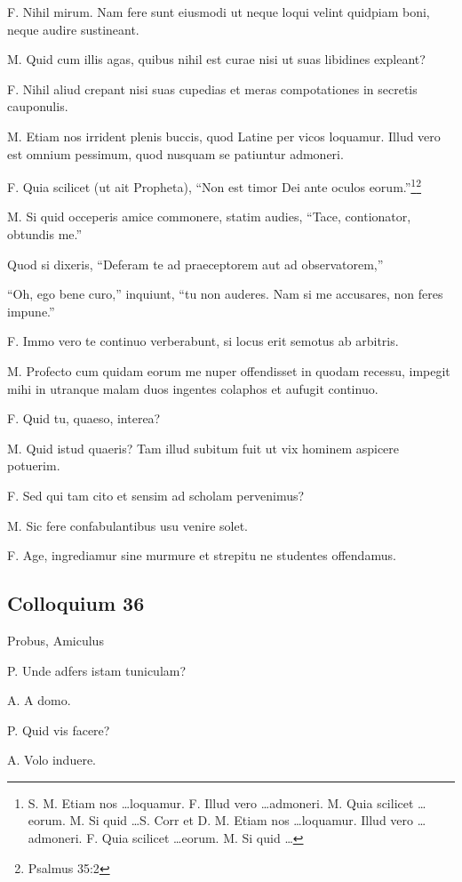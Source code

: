 \documentclass{article}
\begin{document}
F. Nihil mirum. Nam fere sunt eiusmodi ut neque loqui velint quidpiam boni, neque audire sustineant. 

M. Quid cum illis agas, quibus nihil est curae nisi ut suas libidines expleant?

F. Nihil aliud crepant nisi suas cupedias et meras compotationes in secretis cauponulis. 

M. Etiam nos irrident plenis buccis, quod Latine per vicos loquamur. Illud vero est omnium pessimum, quod nusquam se patiuntur admoneri.

F. Quia scilicet (ut ait Propheta), ``Non est timor Dei ante oculos eorum.''\footnote{S. M. Etiam nos \ldots loquamur. F. Illud vero \ldots admoneri. M. Quia scilicet \ldots eorum. M. Si quid \ldots S. Corr et D. M. Etiam nos \ldots loquamur. Illud vero \ldots admoneri. F. Quia scilicet \ldots eorum. M. Si quid \ldots}\footnote{Psalmus 35:2}

M. Si quid occeperis amice commonere, statim audies, ``Tace, contionator, obtundis me.''

Quod si dixeris, ``Deferam te ad praeceptorem aut ad observatorem,''

 ``Oh, ego bene curo,'' inquiunt, ``tu non auderes. Nam si me accusares, non feres impune.'' 

F. Immo vero te continuo verberabunt, si locus erit semotus ab arbitris. 

M. Profecto cum quidam eorum me nuper offendisset in quodam recessu, impegit mihi in utranque malam duos ingentes colaphos et aufugit continuo. 

F. Quid tu, quaeso, interea?

M. Quid istud quaeris? Tam illud subitum fuit ut vix hominem aspicere potuerim. 

F. Sed qui tam cito et sensim ad scholam pervenimus?

M. Sic fere confabulantibus usu venire solet. 

F. Age, ingrediamur sine murmure et strepitu ne studentes offendamus.

\subsection{Colloquium 36}
Probus, Amiculus

P. Unde adfers istam tuniculam?

A. A domo. 

P. Quid vis facere?

A. Volo induere. 
\end{document}
